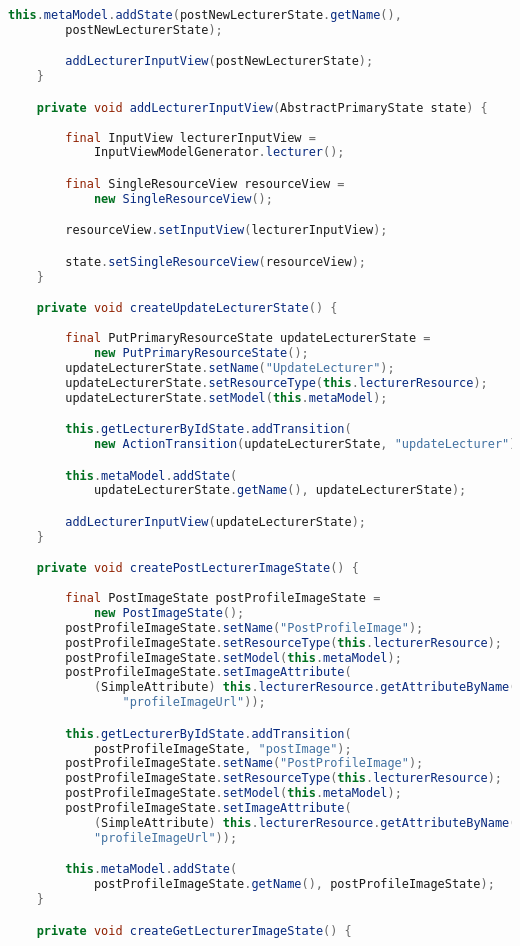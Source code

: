 \begin{lstlisting}[label=lst:enfield_model,
language=java,
firstnumber=1,
caption=Beschreibung des \textit{Enfield-Modell} der Referenzimplementierung. ]
		this.metaModel.addState(postNewLecturerState.getName(),
		postNewLecturerState);

		addLecturerInputView(postNewLecturerState);
	}

	private void addLecturerInputView(AbstractPrimaryState state) {
	
		final InputView lecturerInputView = 
			InputViewModelGenerator.lecturer();

		final SingleResourceView resourceView = 
			new SingleResourceView();

		resourceView.setInputView(lecturerInputView);

		state.setSingleResourceView(resourceView);
	}

	private void createUpdateLecturerState() {
	
		final PutPrimaryResourceState updateLecturerState = 
			new PutPrimaryResourceState();
		updateLecturerState.setName("UpdateLecturer");
		updateLecturerState.setResourceType(this.lecturerResource);
		updateLecturerState.setModel(this.metaModel);

		this.getLecturerByIdState.addTransition(
			new ActionTransition(updateLecturerState, "updateLecturer"));

		this.metaModel.addState(
			updateLecturerState.getName(), updateLecturerState);

		addLecturerInputView(updateLecturerState);
	}

	private void createPostLecturerImageState() {
	
		final PostImageState postProfileImageState = 
			new PostImageState();
		postProfileImageState.setName("PostProfileImage");
		postProfileImageState.setResourceType(this.lecturerResource);
		postProfileImageState.setModel(this.metaModel);
		postProfileImageState.setImageAttribute(
			(SimpleAttribute) this.lecturerResource.getAttributeByName(
				"profileImageUrl"));

		this.getLecturerByIdState.addTransition(
			postProfileImageState, "postImage");
		postProfileImageState.setName("PostProfileImage");
		postProfileImageState.setResourceType(this.lecturerResource);
		postProfileImageState.setModel(this.metaModel);
		postProfileImageState.setImageAttribute(
			(SimpleAttribute) this.lecturerResource.getAttributeByName(
			"profileImageUrl"));

		this.metaModel.addState(
			postProfileImageState.getName(), postProfileImageState);
	}

	private void createGetLecturerImageState() {
	

\end{lstlisting}
